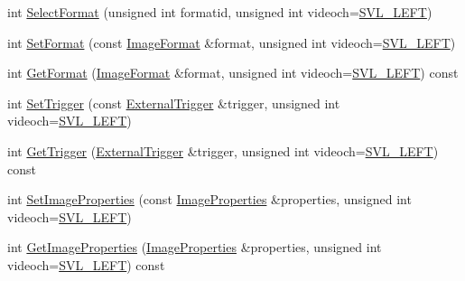 \begin{DoxyCompactItemize}
\item 
int \hyperlink{classsvl_filter_source_video_capture_ae2c6ad1d0236879bd925449a372f2346}{Select\-Format} (unsigned int formatid, unsigned int videoch=\hyperlink{svl_definitions_8h_ab9fec7615f19c8df2919eebcab0b187f}{S\-V\-L\-\_\-\-L\-E\-F\-T})
\item 
int \hyperlink{classsvl_filter_source_video_capture_ae52650c5e7e0c082c11f9f1cd1a80bcc}{Set\-Format} (const \hyperlink{classsvl_filter_source_video_capture_a0944cc8abe4240701683128c28fa5349}{Image\-Format} \&format, unsigned int videoch=\hyperlink{svl_definitions_8h_ab9fec7615f19c8df2919eebcab0b187f}{S\-V\-L\-\_\-\-L\-E\-F\-T})
\item 
int \hyperlink{classsvl_filter_source_video_capture_a249fb6ec35e4888c8426fbc97cf2625c}{Get\-Format} (\hyperlink{classsvl_filter_source_video_capture_a0944cc8abe4240701683128c28fa5349}{Image\-Format} \&format, unsigned int videoch=\hyperlink{svl_definitions_8h_ab9fec7615f19c8df2919eebcab0b187f}{S\-V\-L\-\_\-\-L\-E\-F\-T}) const 
\item 
int \hyperlink{classsvl_filter_source_video_capture_a0a756acc24c4c262b23d40671f8a3d7c}{Set\-Trigger} (const \hyperlink{classsvl_filter_source_video_capture_a609a8eb75ea23b7b35068207cc3c3144}{External\-Trigger} \&trigger, unsigned int videoch=\hyperlink{svl_definitions_8h_ab9fec7615f19c8df2919eebcab0b187f}{S\-V\-L\-\_\-\-L\-E\-F\-T})
\item 
int \hyperlink{classsvl_filter_source_video_capture_a13ad2c1cec2121ea7742f4c00bb49059}{Get\-Trigger} (\hyperlink{classsvl_filter_source_video_capture_a609a8eb75ea23b7b35068207cc3c3144}{External\-Trigger} \&trigger, unsigned int videoch=\hyperlink{svl_definitions_8h_ab9fec7615f19c8df2919eebcab0b187f}{S\-V\-L\-\_\-\-L\-E\-F\-T}) const 
\item 
int \hyperlink{classsvl_filter_source_video_capture_a35dbd104d0ea8c40300e571ee17c2fac}{Set\-Image\-Properties} (const \hyperlink{classsvl_filter_source_video_capture_ad5d8ccc6a284be386d49b60574937f4d}{Image\-Properties} \&properties, unsigned int videoch=\hyperlink{svl_definitions_8h_ab9fec7615f19c8df2919eebcab0b187f}{S\-V\-L\-\_\-\-L\-E\-F\-T})
\item 
int \hyperlink{classsvl_filter_source_video_capture_a3e217734151f975b80fdc1c2e8173e33}{Get\-Image\-Properties} (\hyperlink{classsvl_filter_source_video_capture_ad5d8ccc6a284be386d49b60574937f4d}{Image\-Properties} \&properties, unsigned int videoch=\hyperlink{svl_definitions_8h_ab9fec7615f19c8df2919eebcab0b187f}{S\-V\-L\-\_\-\-L\-E\-F\-T}) const 
\item 

\end{DoxyCompactItemize}
